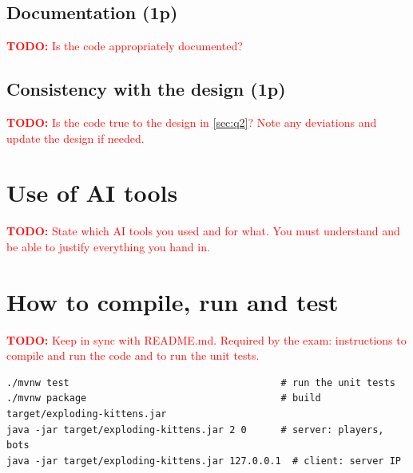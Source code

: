\documentclass[12pt,a4paper]{article}
\newcommand{\todo}[1]{\textcolor{red}{\textbf{TODO:} #1}}   %
\begin{document}
\subsection{Documentation (1p)}
\todo{Is the code appropriately documented?}

\subsection{Consistency with the design (1p)}
\todo{Is the code true to the design in \cref{sec:q2}? Note any deviations and update
the design if needed.}

\section*{Use of AI tools}
\todo{State which AI tools you used and for what. You must understand and be able to
justify everything you hand in.}

\appendix
\section{How to compile, run and test}
\label{app:run}
\todo{Keep in sync with README.md. Required by the exam: instructions to compile and
run the code and to run the unit tests.}

\begin{lstlisting}[language={},caption={Build, test and run.}]
./mvnw test                                     # run the unit tests
./mvnw package                                  # build target/exploding-kittens.jar
java -jar target/exploding-kittens.jar 2 0      # server: players, bots
java -jar target/exploding-kittens.jar 127.0.0.1  # client: server IP
\end{lstlisting}



\end{document}
